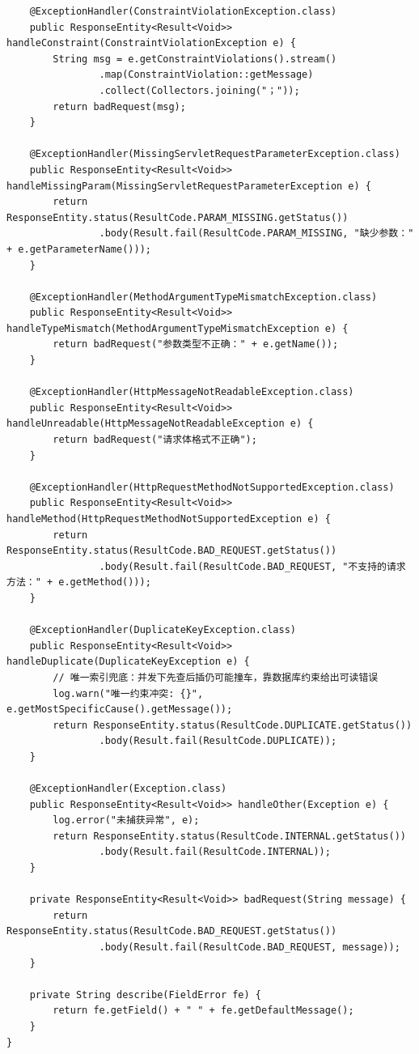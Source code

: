 \documentclass[zihao=-4,UTF8,openany]{ctexart}
\renewcommand{\_}{\textunderscore\allowbreak}
\begin{document}
\begin{lstlisting}
    @ExceptionHandler(ConstraintViolationException.class)
    public ResponseEntity<Result<Void>> handleConstraint(ConstraintViolationException e) {
        String msg = e.getConstraintViolations().stream()
                .map(ConstraintViolation::getMessage)
                .collect(Collectors.joining("；"));
        return badRequest(msg);
    }

    @ExceptionHandler(MissingServletRequestParameterException.class)
    public ResponseEntity<Result<Void>> handleMissingParam(MissingServletRequestParameterException e) {
        return ResponseEntity.status(ResultCode.PARAM_MISSING.getStatus())
                .body(Result.fail(ResultCode.PARAM_MISSING, "缺少参数：" + e.getParameterName()));
    }

    @ExceptionHandler(MethodArgumentTypeMismatchException.class)
    public ResponseEntity<Result<Void>> handleTypeMismatch(MethodArgumentTypeMismatchException e) {
        return badRequest("参数类型不正确：" + e.getName());
    }

    @ExceptionHandler(HttpMessageNotReadableException.class)
    public ResponseEntity<Result<Void>> handleUnreadable(HttpMessageNotReadableException e) {
        return badRequest("请求体格式不正确");
    }

    @ExceptionHandler(HttpRequestMethodNotSupportedException.class)
    public ResponseEntity<Result<Void>> handleMethod(HttpRequestMethodNotSupportedException e) {
        return ResponseEntity.status(ResultCode.BAD_REQUEST.getStatus())
                .body(Result.fail(ResultCode.BAD_REQUEST, "不支持的请求方法：" + e.getMethod()));
    }

    @ExceptionHandler(DuplicateKeyException.class)
    public ResponseEntity<Result<Void>> handleDuplicate(DuplicateKeyException e) {
        // 唯一索引兜底：并发下先查后插仍可能撞车，靠数据库约束给出可读错误
        log.warn("唯一约束冲突: {}", e.getMostSpecificCause().getMessage());
        return ResponseEntity.status(ResultCode.DUPLICATE.getStatus())
                .body(Result.fail(ResultCode.DUPLICATE));
    }

    @ExceptionHandler(Exception.class)
    public ResponseEntity<Result<Void>> handleOther(Exception e) {
        log.error("未捕获异常", e);
        return ResponseEntity.status(ResultCode.INTERNAL.getStatus())
                .body(Result.fail(ResultCode.INTERNAL));
    }

    private ResponseEntity<Result<Void>> badRequest(String message) {
        return ResponseEntity.status(ResultCode.BAD_REQUEST.getStatus())
                .body(Result.fail(ResultCode.BAD_REQUEST, message));
    }

    private String describe(FieldError fe) {
        return fe.getField() + " " + fe.getDefaultMessage();
    }
}
\end{lstlisting}
\end{document}
